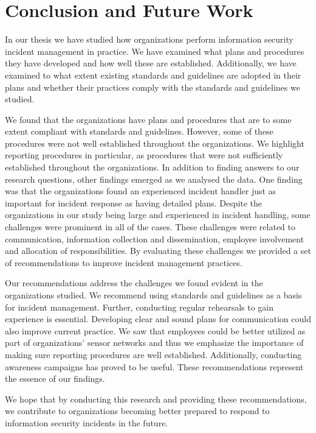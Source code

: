 \chapter{Conclusion and Future Work}
\label{chp:conclusion}
In our thesis we have studied how organizations perform information security incident management in practice. We have examined what plans and procedures they have developed and how well these are established. Additionally, we have examined to what extent existing standards and guidelines are adopted in their plans and whether their practices comply with the standards and guidelines we studied.

We found that the organizations have plans and procedures that are to some extent compliant with standards and guidelines. However, some of these procedures were not well established throughout the organizations. We highlight reporting procedures in particular, as procedures that were not sufficiently established throughout the organizations. In addition to finding answers to our research questions, other findings emerged as we analysed the data. One finding was that the organizations found an experienced incident handler just as important for incident response as having detailed plans. Despite the organizations in our study being large and experienced in incident handling, some challenges were prominent in all of the cases. These challenges were related to communication, information collection and dissemination, employee involvement and allocation of responsibilities. By evaluating these challenges we provided a set of recommendations to improve incident management practices.

Our recommendations address the challenges we found evident in the organizations studied. We recommend using standards and guidelines as a basis for incident management. Further, conducting regular rehearsals to gain experience is essential. Developing clear and sound plans for communication could also improve current practice. We saw that employees could be better utilized as part of organizations' sensor networks and thus we emphasize the importance of making sure reporting procedures are well established. Additionally, conducting awareness campaigns has proved to be useful. These recommendations represent the essence of our findings. 

We hope that by conducting this research and providing these recommendations, we contribute to organizations becoming better prepared to respond to information security incidents in the future. 

